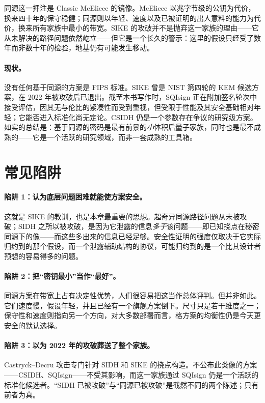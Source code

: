 \begin{remark}
同源这一押注是 Classic McEliece 的镜像。McEliece 以兆字节级的公钥为代价，换来四十年的保守稳健；同源则以年轻、速度以及已被证明的出人意料的能力为代价，换来所有家族中最小的带宽。SIKE 的攻破并不是抛弃这一家族的理由——它从未解决的路径问题依然屹立——但它是一个长久的警示：这里的假设只经受了数年而非数十年的检验，地基仍有可能发生移动。
\end{remark}

\paragraph{现状。}
没有任何基于同源的方案是 FIPS 标准。SIKE 曾是 NIST 第四轮的 KEM 候选方案，在 2022 年被攻破后已退出。截至本书写作时，SQIsign 正在附加签名轮次中接受评估，因其无与伦比的紧凑性而受到重视，但受限于性能及其安全基础相对年轻；它能否进入标准化尚无定论。CSIDH 仍是一个参数存在争议的研究级方案。如实的总结是：基于同源的密码是最有前景的\emph{小}体积后量子家族，同时也是最不成熟的——它是一个活跃的研究领域，而非一套成熟的工具箱。

\section{常见陷阱}

\paragraph{陷阱 1：认为底层问题困难就能使方案安全。}
这就是 SIKE 的教训，也是本章最重要的思想。超奇异同源路径问题从未被攻破；SIDH 之所以被攻破，是因为它泄露的信息\emph{多于}该问题——即已知挠点在秘密同源下的像——而这些多出来的信息已经足够。安全性证明的强度仅取决于它实际归约到的那个假设，而一个泄露辅助结构的协议，可能归约到的是一个比其设计者预想的容易得多的问题。

\paragraph{陷阱 2：把“密钥最小”当作“最好”。}
同源方案在带宽上占有决定性优势，人们很容易把这当作总体评判。但并非如此。它们速度慢，假设年轻，并且已经有一个旗舰方案倒下。尺寸只是若干维度之一；保守性和速度则指向另一个方向，对大多数部署而言，格方案的均衡性仍是今天更安全的默认选择。

\paragraph{陷阱 3：以为 2022 年的攻破葬送了整个家族。}
Castryck--Decru 攻击专门针对 SIDH 和 SIKE 的挠点构造。不公布此类像的方案——CSIDH、SQIsign——不受其影响，而这一家族通过 SQIsign 仍是一个活跃的标准化候选者。“SIDH 已被攻破”与“同源已被攻破”是截然不同的两个陈述；只有前者为真。

